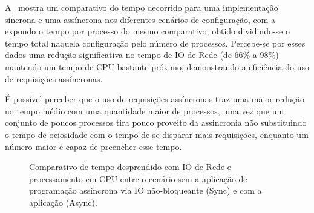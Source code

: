 A~ mostra um comparativo do tempo decorrido para
uma implementação síncrona e uma assíncrona nos diferentes cenários de
configuração, com a~ expondo o tempo por
processo do mesmo comparativo, obtido dividindo-se o tempo total naquela
configuração pelo número de processos. Percebe-se por esses dados uma redução
significativa no tempo de IO de Rede (de 66\% a 98\%) mantendo um tempo de CPU
bastante próximo, demonstrando a eficiência do uso de requisições assíncronas.

É possível perceber que o uso de requisições assíncronas traz uma maior redução
no tempo médio com uma quantidade maior de processos, uma vez que um conjunto
de poucos processos tira pouco proveito da assincronia não substituindo o tempo
de ociosidade com o tempo de se disparar mais requisições, enquanto um número
maior é capaz de preencher esse tempo.

\begin{figure}[htb]
    \centering
    \caption{%
      Comparativo de tempo desprendido com IO de Rede e processamento em CPU
      entre o cenário sem a aplicação de programação assíncrona via IO
      não-bloqueante (Sync) e com a aplicação (Async).
    }
    \label{gra:tempos-async-vs-sync}
\end{figure}

